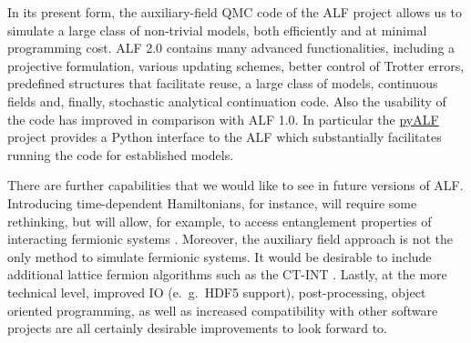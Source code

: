 
In its present form, the  auxiliary-field QMC code of the ALF project allows us to simulate a large class of non-trivial models, both efficiently and at minimal  programming cost.  ALF 2.0 contains many advanced functionalities, including a projective formulation, various updating schemes, better control of Trotter errors, predefined structures that facilitate reuse, a large class of models, continuous fields and, finally, stochastic analytical continuation code. Also the usability of the code has improved in comparison with ALF 1.0. In particular the \href{https://git.physik.uni-wuerzburg.de/ALF/pyALF}{pyALF} project provides a Python interface to the ALF which substantially facilitates running the code for established models.

There are further capabilities that we would like to see in future versions of ALF. Introducing time-dependent Hamiltonians, for instance, will require some rethinking, but will allow, for example, to access entanglement properties of interacting fermionic systems \cite{Broecker14,Assaad14,Assaad13a,Assaad15}. Moreover, the auxiliary field approach is not the only method to simulate fermionic systems.
It would be desirable to include additional lattice fermion algorithms such as the CT-INT \cite{Rubtsov05,Assaad07}.
Lastly, at the more technical level, improved IO (e.~g.~HDF5 support), post-processing, object oriented programming, as well as increased compatibility with other software projects are all certainly desirable improvements to look forward to. 
